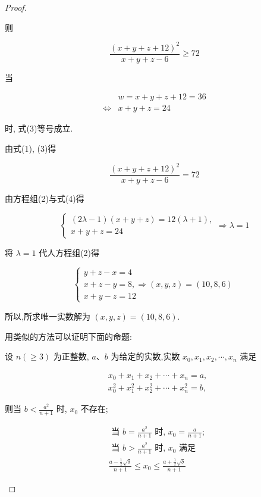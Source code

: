 \begin{proof}
\begin{example}
\begin{solution}
\begin{solution}
	则
	
	
	\begin{equation*}
	\frac{(x+y+z+12)^{2}}{x+y+z-6} \geqslant 72 \tag{3}
	\end{equation*}
	
	
	当
	
	
	\begin{align*}
	& w=x+y+z+12=36 \\
	\Leftrightarrow & x+y+z=24 \tag{4}
	\end{align*}
	
	
	时, 式(3)等号成立.
	
	由式(1), (3)得
	
	$$
	\frac{(x+y+z+12)^{2}}{x+y+z-6}=72
	$$
	
	由方程组(2)与式(4)得
	
	$$
	\left\{\begin{array}{l}
	(2 \lambda-1)(x+y+z)=12(\lambda+1), \\
	x+y+z=24
	\end{array} \Rightarrow \lambda=1\right.
	$$
	
	将 $\lambda=1$ 代人方程组(2)得
	
	$$
	\left\{\begin{array}{l}
	y+z-x=4 \\
	x+z-y=8, \Rightarrow(x, y, z)=(10,8,6) \\
	x+y-z=12
	\end{array}\right.
	$$
	
	所以,所求唯一实数解为 $(x, y, z)=(10,8,6)$.
\end{solution}
\begin{note}
	用类似的方法可以证明下面的命题:
	
	设 $n(\geqslant 3)$ 为正整数, $a 、 b$ 为给定的实数,实数 $x_{0}, x_{1}, x_{2}, \cdots, x_{n}$ 满足
	
	$$
	\begin{aligned}
	& x_{0}+x_{1}+x_{2}+\cdots+x_{n}=a, \\
	& x_{0}^{2}+x_{1}^{2}+x_{2}^{2}+\cdots+x_{n}^{2}=b,
	\end{aligned}
	$$
	
	则当 $b<\frac{a^{2}}{n+1}$ 时, $x_{0}$ 不存在;
	
	$$
	\begin{aligned}
	& \text { 当 } b=\frac{a^{2}}{n+1} \text { 时, } x_{0}=\frac{a}{n+1} \text {; } \\
	& \text { 当 } b>\frac{a^{2}}{n+1} \text { 时, } x_{0} \text { 满足 } \\
	& \frac{a-\frac{1}{2} \sqrt{\delta}}{n+1} \leqslant x_{0} \leqslant \frac{a+\frac{1}{2} \sqrt{\delta}}{n+1}
	\end{aligned}
	$$
	

\end{note}
\end{solution}
\end{example}
\end{proof}

